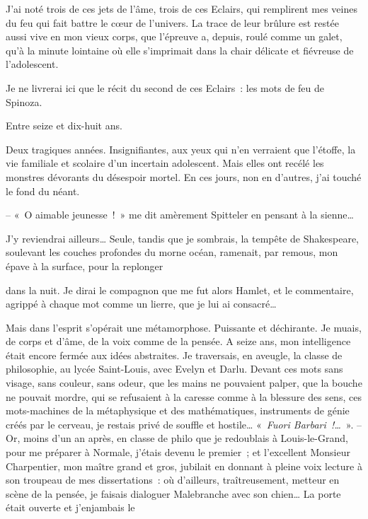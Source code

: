 J'ai noté trois de ces jets de l'âme, trois de ces Eclairs, qui
remplirent mes veines du feu qui fait battre le c\oe ur de l'univers. La
trace de leur brûlure est restée aussi vive en mon vieux corps, que
l'épreuve a, depuis, roulé comme un galet, qu'à la minute lointaine où
elle s'imprimait dans la chair délicate et fiévreuse de l'adolescent.

Je ne livrerai ici que le récit du second de ces Eclairs~: les mots de
feu de Spinoza.

Entre seize et dix-huit ans.

Deux tragiques années. Insignifiantes, aux yeux qui n'en verraient que
l'étoffe, la vie familiale et scolaire d'un incertain adolescent. Mais
elles ont recélé les monstres dévorants du désespoir mortel. En ces
jours, non en d'autres, j'ai touché le fond du néant.

-- «~O aimable jeunesse~!~» me dit amèrement Spitteler en pensant à la
sienne\ldots{}

J'y reviendrai ailleurs\ldots{} Seule, tandis que je sombrais, la tempête de
Shakespeare, soulevant les couches profondes du morne océan, ramenait,
par remous, mon épave à la surface, pour la replonger \linebreak

\quebra

\noindent{}dans la nuit. Je
dirai le compagnon que me fut alors Hamlet, et le commentaire, agrippé à
chaque mot comme un lierre, que je lui ai consacré\ldots{}

Mais dans l'esprit s'opérait une métamorphose. Puissante et déchirante.
Je muais, de corps et d'âme, de la voix comme de la pensée. A seize ans,
mon intelligence était encore fermée aux idées abstraites. Je
traversais, en aveugle, la classe de philosophie, au lycée Saint-Louis,
avec Evelyn et Darlu. Devant ces mots sans visage, sans couleur, sans
odeur, que les mains ne pouvaient palper, que la bouche ne pouvait
mordre, qui se refusaient à la caresse comme à la blessure des sens, ces
mots-machines de la métaphysique et des mathématiques, instruments de
génie créés par le cerveau, je restais privé de souffle et hostile\ldots{}
«~\emph{Fuori Barbari~!\ldots{}}~». -- Or, moins d'un an après, en classe de
philo que je redoublais à Louis-le-Grand, pour me préparer à Normale,
j'étais devenu le premier~; et l'excellent Monsieur Charpentier, mon
maître grand et gros, jubilait en donnant à pleine voix lecture à son
troupeau de mes dissertations~: où d'ailleurs, traîtreusement, metteur
en scène de la pensée, je faisais dialoguer Malebranche avec son
chien\ldots{} La porte était ouverte et j'enjambais le \linebreak

